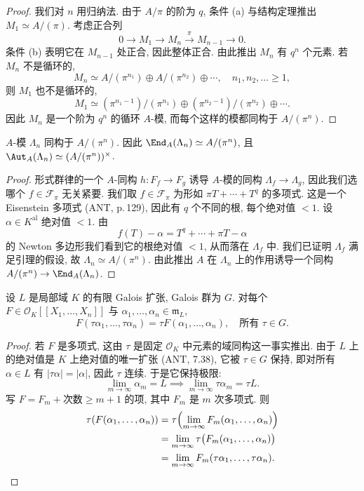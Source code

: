 \begin{proof}
我们对 $n$ 用归纳法. 由于 $A/\pi$ 的阶为 $q$, 条件 (a) 与结构定理推出 $M_1\simeq A/(\pi)$. 考虑正合列
\[
0\to M_1\to M_n\xrightarrow{\pi}M_{n-1}\to 0.
\]
条件 (b) 表明它在 $M_{n-1}$ 处正合, 因此整体正合. 由此推出 $M_n$ 有 $q^n$ 个元素. 若 $M_n$ 不是循环的,
\[
M_n\simeq A/(\pi^{n_1})\oplus A/(\pi^{n_2})\oplus\cdots,\quad n_1,n_2,\ldots\ge 1,
\]
则 $M_1$ 也不是循环的,
\[
M_1\simeq(\pi^{n_1-1})/(\pi^{n_1})\oplus(\pi^{n_2-1})/(\pi^{n_2})\oplus\cdots.
\]
因此 $M_n$ 是一个阶为 $q^n$ 的循环 $A$-模, 而每个这样的模都同构于 $A/(\pi^n)$.
\end{proof}

\begin{proposition}\label{prop:3.4}
$A$-模 $\Lambda_n$ 同构于 $A/(\pi^n)$. 因此 $\End_A(\Lambda_n)\simeq A/(\pi^n)$, 且 $\Aut_A(\Lambda_n)\simeq(A/(\pi^n))^{\times}$.
\end{proposition}

\begin{proof}
形式群律的一个 $A$-同构 $h\colon F_f\to F_g$ 诱导 $A$-模的同构 $\Lambda_f\to\Lambda_g$, 因此我们选哪个 $f\in\mathcal{F}_{\pi}$ 无关紧要. 我们取 $f\in\mathcal{F}_{\pi}$ 为形如 $\pi T+\cdots+T^q$ 的多项式. 这是一个 Eisenstein 多项式 (ANT, p.\,129), 因此有 $q$ 个不同的根, 每个绝对值 $<1$. 设 $\alpha\in K^{\mathrm{al}}$ 绝对值 $<1$. 由
\[
f(T)-\alpha=T^q+\cdots+\pi T-\alpha
\]
的 Newton 多边形我们看到它的根绝对值 $<1$, 从而落在 $\Lambda_f$ 中. 我们已证明 $\Lambda_f$ 满足引理的假设, 故 $\Lambda_n\simeq A/(\pi^n)$. 由此推出 $A$ 在 $\Lambda_n$ 上的作用诱导一个同构 $A/(\pi^n)\to\End_A(\Lambda_n)$.
\end{proof}

\begin{lemma}\label{lem:3.5}
设 $L$ 是局部域 $K$ 的有限 Galois 扩张, Galois 群为 $G$. 对每个 $F\in\mathcal{O}_K[[X_1,\ldots,X_n]]$ 与 $\alpha_1,\ldots,\alpha_n\in\mathfrak{m}_L$,
\[
F(\tau\alpha_1,\ldots,\tau\alpha_n)=\tau F(\alpha_1,\ldots,\alpha_n),\quad\text{所有 }\tau\in G.
\]
\end{lemma}

\begin{proof}
若 $F$ 是多项式, 这由 $\tau$ 是固定 $\mathcal{O}_K$ 中元素的域同构这一事实推出. 由于 $L$ 上的绝对值是 $K$ 上绝对值的唯一扩张 (ANT, 7.38), 它被 $\tau\in G$ 保持, 即对所有 $\alpha\in L$ 有 $|\tau\alpha|=|\alpha|$, 因此 $\tau$ 连续. 于是它保持极限:
\[
\lim_{m\to\infty}\alpha_m=L\implies\lim_{m\to\infty}\tau\alpha_m=\tau L.
\]
写 $F=F_m+\text{次数}\ge m+1\text{ 的项}$, 其中 $F_m$ 是 $m$ 次多项式. 则
\[
\begin{aligned}
\tau(F(\alpha_1,\ldots,\alpha_n))&=\tau\Bigl(\lim_{m\to\infty}F_m(\alpha_1,\ldots,\alpha_n)\Bigr)\\
&=\lim_{m\to\infty}\tau\bigl(F_m(\alpha_1,\ldots,\alpha_n)\bigr)\\
&=\lim_{m\to\infty}F_m(\tau\alpha_1,\ldots,\tau\alpha_n).
\end{aligned}
\]
\end{proof}

